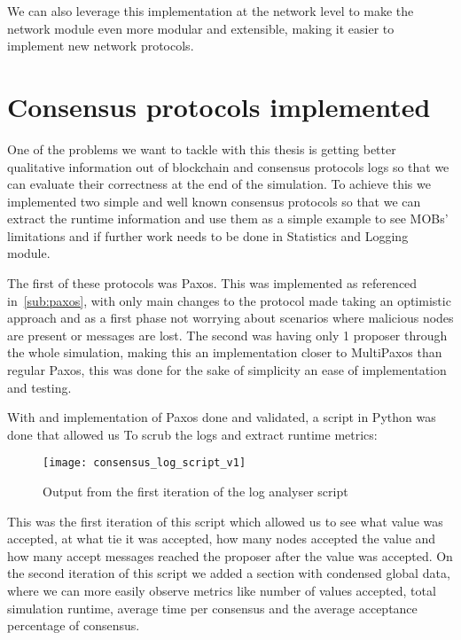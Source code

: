 We can also leverage this implementation at the network level to make the network
module even more modular and extensible, making it easier to implement new network protocols.

\section{Consensus protocols implemented}\label{sub:consensus_protocols_implemented}

One of the problems we want to tackle with this thesis is getting better qualitative information out of
blockchain and consensus protocols logs so that we can evaluate their correctness at the end 
of the simulation. To achieve this we implemented two simple and well known consensus protocols
so that we can extract the runtime information and use them as a simple example to see MOBs' limitations
and if further work needs to be done in Statistics and Logging module.

The first of these protocols was Paxos. This was implemented as referenced in~\ref{sub:paxos},
with only main changes to the protocol made taking an optimistic approach and as a first phase
not worrying about scenarios where malicious nodes are present or messages are lost. The second was
having only 1 proposer through the whole simulation, making this an implementation closer to MultiPaxos
than regular Paxos, this was done for the sake of simplicity an ease of implementation and testing.

With and implementation of Paxos done and validated, a script in Python was done that allowed us To
scrub the logs and extract runtime metrics:

\begin{figure}[h]
	\centering
	\texttt{[image: consensus\_log\_script\_v1]}
	\caption{Output from the first iteration of the log analyser script}
	\label{fig:consensus_log_script_v1}
\end{figure}

This was the first iteration of this script which allowed us to see what value was accepted,
at what tie it was accepted, how many nodes accepted the value and how many accept messages
reached the proposer after the value was accepted. 
On the second iteration of this script we added a section with condensed global data, where we can more
easily observe metrics like number of values accepted, total simulation runtime, average time per consensus
and the average acceptance percentage of consensus. 

